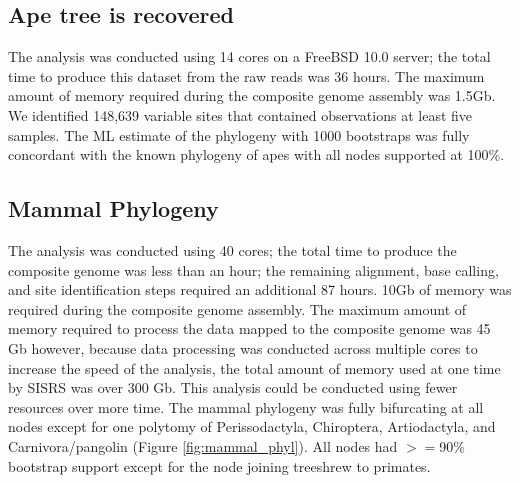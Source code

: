 \documentclass[11pt, oneside]{article}   	%
\begin{document}
\subsection{Ape tree is recovered}

The analysis was conducted using 14 cores on a FreeBSD 10.0 server; the total time to produce this dataset from the raw reads was 36 hours.
The maximum amount of memory required during the composite genome assembly was 1.5Gb.
We identified 148,639 variable sites that contained observations at least five samples. 
The ML estimate of the phylogeny with 1000 bootstraps was fully concordant with the known phylogeny of apes with all nodes supported at 100\%.%

\subsection{Mammal Phylogeny}

The analysis was conducted using 40 cores; the total time to produce the composite genome was less than an hour;
the remaining alignment, base calling, and site identification steps required an additional 
87 hours.
10Gb of memory was required during the composite genome assembly.
The maximum amount of memory required to process the data mapped to the composite genome was 45 Gb however, because data processing was conducted across multiple cores to increase the speed of the analysis, the total amount of memory used at one time by SISRS was over 300 Gb.
This analysis could be conducted using fewer resources over more time.
The mammal phylogeny was fully bifurcating at all nodes except for one polytomy of Perissodactyla, Chiroptera, Artiodactyla, and Carnivora/pangolin (Figure \ref{fig:mammal_phyl}).
All nodes had $>=$90\% bootstrap support except for the node joining treeshrew to primates. 
\end{document}
